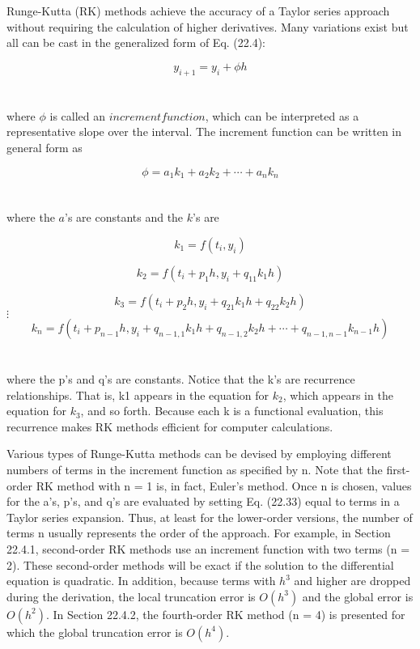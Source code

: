 \documentclass[../main.tex]{subfiles}
\begin{document}
Runge-Kutta (RK) methods achieve the accuracy of a Taylor series approach without
requiring the calculation of higher derivatives. Many variations exist but all can be cast in
the generalized form of Eq. (22.4):

\begin{equation}
\tag{22.33}
y_{i+1} = y_{i} + \phi h
\end{equation}\\
\\
where $\phi$ is called an $increment function$, which can be interpreted as a representative slope
over the interval. The increment function can be written in general form as

\begin{equation}
\tag{22.34}
\phi = a_{1}k_{1} + a_{2}k_{2} + \cdots + a_{n}k_{n}
\end{equation}\\
\\
where the $a$'s are constants and the $k$'s are

\begin{equation}
\tag{22.34a}
k_{1} = f(t_{i}, y_{i})
\end{equation}

\begin{equation}
\tag{22.34b}
k_{2} = f( t_{i} + p_{1}h, y_{i} + q_{11}k_{1}h)
\end{equation}

\begin{equation}
\tag{22.34c}
k_{3} = f(t_{i} + p_{2}h, y_{i} + q_{21}k_{1}h + q_{22}k_{2}h)
\end{equation}
\textbf{$\vdots$}
\begin{equation}
\tag{22.34d}
k_{n} = f( t_{i} + p_{n-1}h, y_{i} + q_{n-1,1} k_{1} h + q_{n-1,2}k_{2}h + \cdots + q_{n-1, n-1} k_{n-1} h )
\end{equation}\\
\\
where the p's and q's are constants. Notice that the k's are recurrence relationships. That is,
k1 appears in the equation for $k_{2}$, which appears in the equation for $k_{3}$, and so forth. Because each k is a functional evaluation, this recurrence makes RK methods efficient for
computer calculations.

Various types of Runge-Kutta methods can be devised by employing different numbers of terms in the increment function as specified by n. Note that the first-order RK
method with n = 1 is, in fact, Euler's method. Once n is chosen, values for the a's, p's, and
q's are evaluated by setting Eq. (22.33) equal to terms in a Taylor series expansion. Thus,
at least for the lower-order versions, the number of terms n usually represents the order of
the approach. For example, in Section 22.4.1, second-order RK methods use an increment
function with two terms (n = 2). These second-order methods will be exact if the solution
to the differential equation is quadratic. In addition, because terms with $h^3$ and higher are
dropped during the derivation, the local truncation error is $O(h^3)$ and the global error is $O(h^2)$. In Section 22.4.2, the fourth-order RK method (n = 4) is presented for which the
global truncation error is $O(h^4)$.
\end{document}
